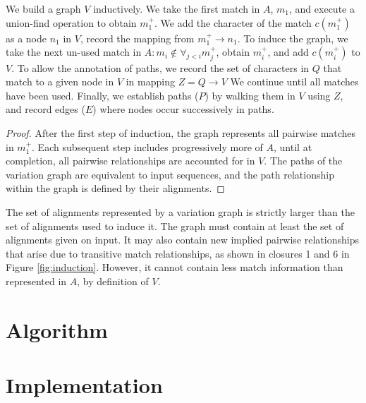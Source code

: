 \documentclass{bioinfo}
\theoremstyle{definition}
\begin{document}
We build a graph $V$ inductively.
We take the first match in $A$, $m_1$, and execute a union-find operation to obtain $m_1^+$.
We add the character of the match $c(m_1^+)$ as a node $n_1$ in $V$, record the mapping from $m_1^+ \to n_1$.
To induce the graph, we take the next un-used match in $A : m_i \notin \forall_{j < i} m_j^+$, obtain $m_i^+$, and add $c(m_i^+)$ to $V$.
To allow the annotation of paths, we record the set of characters in $Q$ that match to a given node in $V$ in mapping $Z = Q \to V$
We continue until all matches have been used.
Finally, we establish paths ($P$) by walking them in $V$ using $Z$, and record edges ($E$) where nodes occur successively in paths.

\begin{proof}
After the first step of induction, the graph represents all pairwise matches in $m_1^+$.
Each subsequent step includes progressively more of $A$, until at completion, all pairwise relationships are accounted for in $V$.
The paths of the variation graph are equivalent to input sequences, and the path relationship within the graph is defined by their alignments.
\end{proof}

The set of alignments represented by a variation graph is strictly larger than the set of alignments used to induce it.
The graph must contain at least the set of alignments given on input.
It may also contain new implied pairwise relationships that arise due to transitive match relationships, as shown in closures 1 and 6 in Figure \ref{fig:induction}.
However, it cannot contain less match information than represented in $A$, by definition of $V$.





\section{Algorithm}



\section{Implementation}
\end{document}
